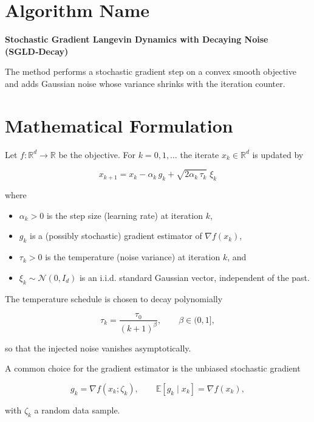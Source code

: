\documentclass{article}
\newcommand{\E}{\mathbb{E}}
\newcommand{\R}{\mathbb{R}}
\begin{document}
\section*{Algorithm Name}
\textbf{Stochastic Gradient Langevin Dynamics with Decaying Noise (SGLD‑Decay)}  

The method performs a stochastic gradient step on a convex smooth objective and adds Gaussian
noise whose variance shrinks with the iteration counter.

\section*{Mathematical Formulation}
Let $f:\R^{d}\rightarrow\R$ be the objective.  
For $k=0,1,\dots$ the iterate $x_{k}\in\R^{d}$ is updated by  

\[
\boxed{
x_{k+1}=x_{k}-\alpha_{k}\,g_{k}+\sqrt{2\alpha_{k}\,\tau_{k}}\;\xi_{k}
}
\tag{1}
\]

where  

\begin{itemize}
  \item $\alpha_{k}>0$ is the step size (learning rate) at iteration $k$,
  \item $g_{k}$ is a (possibly stochastic) gradient estimator of $\nabla f(x_{k})$,
  \item $\tau_{k}>0$ is the temperature (noise variance) at iteration $k$, and
  \item $\xi_{k}\sim\mathcal N(0,I_{d})$ is an i.i.d. standard Gaussian vector, independent of the past.
\end{itemize}

The temperature schedule is chosen to decay polynomially  

\[
\tau_{k}= \frac{\tau_{0}}{(k+1)^{\beta}},\qquad \beta\in(0,1],
\tag{2}
\]

so that the injected noise vanishes asymptotically.

A common choice for the gradient estimator is the unbiased stochastic gradient  

\[
g_{k}= \nabla f(x_{k};\zeta_{k}),\qquad 
\E\!\left[g_{k}\mid x_{k}\right]=\nabla f(x_{k}),
\tag{3}
\]

with $\zeta_{k}$ a random data sample.
\end{document}
